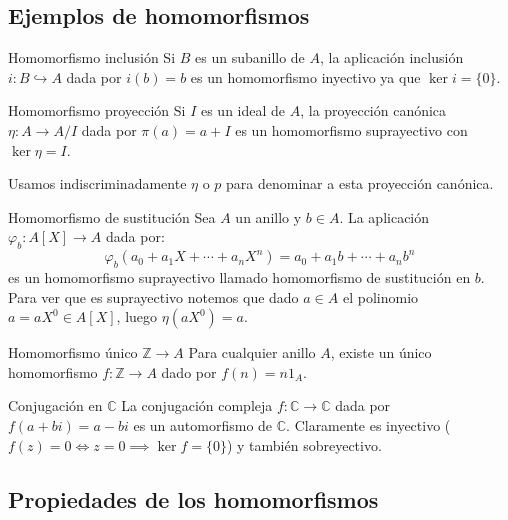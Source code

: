 \subsection{Ejemplos de homomorfismos}

\begin{example}{Homomorfismo inclusión}{}
    Si \(B\) es un subanillo de \(A\), la aplicación inclusión \(i: B \hookrightarrow A\) dada por \(i(b) = b\) es un homomorfismo inyectivo ya que $\ker i = \{0\}$.
\end{example}


\begin{example}{Homomorfismo proyección}{}
    Si \(I\) es un ideal de \(A\), la proyección canónica \(\eta: A \to A/I\) dada por \(\pi(a) = a + I\) es un homomorfismo suprayectivo con \(\ker \eta = I\).
\end{example}

\begin{remark}
    Usamos indiscriminadamente $\eta$ o $p$ para denominar a esta proyección canónica.
\end{remark}

\begin{example}{Homomorfismo de sustitución}{}
    Sea \(A\) un anillo y \(b \in A\). La aplicación \(\varphi_b: A[X] \to A\) dada por:
    \[
    \varphi_b(a_0 + a_1X + \cdots + a_nX^n) = a_0 + a_1b + \cdots + a_nb^n
    \]
    es un homomorfismo suprayectivo llamado homomorfismo de sustitución en \(b\). Para ver que es suprayectivo notemos que dado $a \in A$ el polinomio $a = aX^0 \in A[X]$, luego $\eta(aX^0) = a$.
\end{example}

\begin{example}{Homomorfismo único \(\mathbb{Z} \to A\)}{}
    Para cualquier anillo \(A\), existe un único homomorfismo \(f: \mathbb{Z} \to A\) dado por \(f(n) = n 1_A\).
\end{example}

\begin{example}{Conjugación en \(\mathbb{C}\)}{}
    La conjugación compleja \(f: \mathbb{C} \to \mathbb{C}\) dada por \(f(a + bi) = a - bi\) es un automorfismo de \(\mathbb{C}\). Claramente es inyectivo ($f(z) = 0 \iff z = 0 \implies \ker f = \{0\}$) y también sobreyectivo.
\end{example}

\subsection{Propiedades de los homomorfismos}


